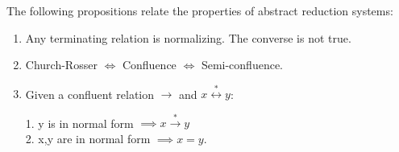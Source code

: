 \begin{proposition} 
The following propositions relate the properties of abstract reduction systems:

\begin{enumerate}
\item Any terminating relation is normalizing. The converse is not true. 
\item Church-Rosser $\iff$ Confluence $\iff$ Semi-confluence. 
\item Given a confluent relation $\to$ and $x \stackrel{*}{\leftrightarrow} y$:

1. y is in normal form $ \implies x \stackrel{*}{\rightarrow} y$\\
2. x,y are in normal form $ \implies x = y$. 
\end{enumerate}
\end{proposition}
